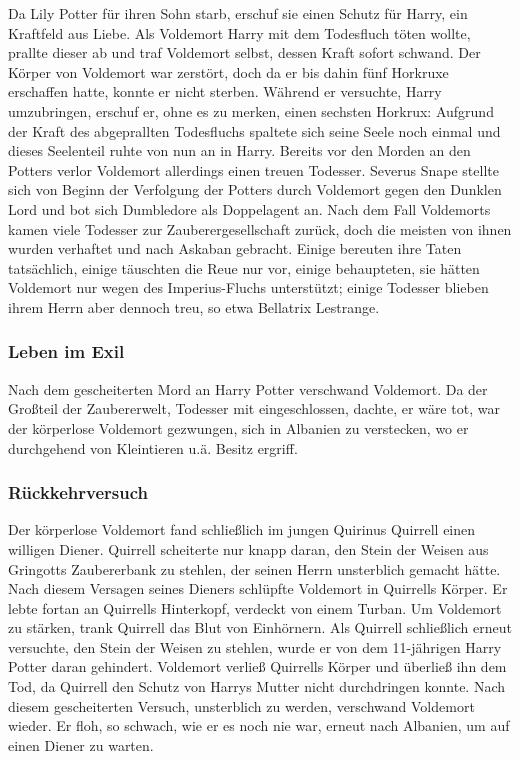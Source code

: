 \documentclass[a4paper, 10pt]{article}
\begin{document}
\vspace{10pt}
\newline
Da Lily Potter für ihren Sohn starb, erschuf sie einen Schutz für Harry, ein Kraftfeld aus Liebe. Als Voldemort Harry mit dem Todesfluch töten wollte, prallte dieser ab und traf Voldemort selbst, dessen Kraft sofort schwand. Der Körper von Voldemort war zerstört, doch da er bis dahin fünf Horkruxe erschaffen hatte, konnte er nicht sterben. Während er versuchte, Harry umzubringen, erschuf er, ohne es zu merken, einen sechsten Horkrux: Aufgrund der Kraft des abgeprallten Todesfluchs spaltete sich seine Seele noch einmal und dieses Seelenteil ruhte von nun an in Harry.
\vspace{10pt}
\newline
Bereits vor den Morden an den Potters verlor Voldemort allerdings einen treuen Todesser. Severus Snape stellte sich von Beginn der Verfolgung der Potters durch Voldemort gegen den Dunklen Lord und bot sich Dumbledore als Doppelagent an.
\vspace{10pt}
\newline
Nach dem Fall Voldemorts kamen viele Todesser zur Zauberergesellschaft zurück, doch die meisten von ihnen wurden verhaftet und nach Askaban gebracht. Einige bereuten ihre Taten tatsächlich, einige täuschten die Reue nur vor, einige behaupteten, sie hätten Voldemort nur wegen des Imperius-Fluchs unterstützt; einige Todesser blieben ihrem Herrn aber dennoch treu, so etwa Bellatrix Lestrange.
\subsubsection*{\large Leben im Exil}
Nach dem gescheiterten Mord an Harry Potter verschwand Voldemort. Da der Großteil der Zaubererwelt, Todesser mit eingeschlossen, dachte, er wäre tot, war der körperlose Voldemort gezwungen, sich in Albanien zu verstecken, wo er durchgehend von Kleintieren u.ä. Besitz ergriff.
\subsubsection*{\large Rückkehrversuch}
Der körperlose Voldemort fand schließlich im jungen Quirinus Quirrell einen willigen Diener. Quirrell scheiterte nur knapp daran, den Stein der Weisen aus Gringotts Zaubererbank zu stehlen, der seinen Herrn unsterblich gemacht hätte. Nach diesem Versagen seines Dieners schlüpfte Voldemort in Quirrells Körper. Er lebte fortan an Quirrells Hinterkopf, verdeckt von einem Turban. Um Voldemort zu stärken, trank Quirrell das Blut von Einhörnern. Als Quirrell schließlich erneut versuchte, den Stein der Weisen zu stehlen, wurde er von dem 11-jährigen Harry Potter daran gehindert. Voldemort verließ Quirrells Körper und überließ ihn dem Tod, da Quirrell den Schutz von Harrys Mutter nicht durchdringen konnte.
\vspace{10pt}
\newline
Nach diesem gescheiterten Versuch, unsterblich zu werden, verschwand Voldemort wieder. Er floh, so schwach, wie er es noch nie war, erneut nach Albanien, um auf einen Diener zu warten.
\end{document}
